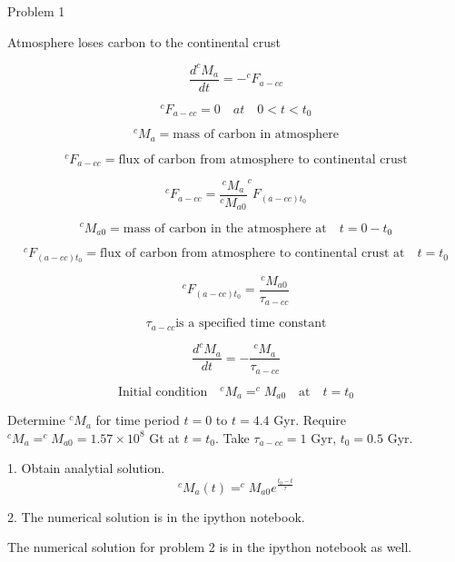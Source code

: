 Problem 1

Atmosphere loses carbon to the continental crust

\begin{equation}
  \frac{d^{c}M_{a}}{dt} = -^{c}F_{a-cc}
\end{equation}

\begin{equation}
  ^{c}F_{a-cc} = 0 \quad at \quad 0 < t < t_0
\end{equation}

\begin{equation}
  ^{c}M_{a} = \text{mass of carbon in atmosphere}
\end{equation}

\begin{equation}
  ^{c}F_{a-cc} = \text{flux of carbon from atmosphere to continental crust}
\end{equation}

\begin{equation}
  ^{c}F_{a-cc} = \frac{^{c}M_{a}}{^{c}M_{a0}} ^{c}F_{(a-cc)t_{0}}
\end{equation}

\begin{equation}
  ^{c}M_{a0} = \text{mass of carbon in the atmosphere at} \quad t = 0 - t_{0}
\end{equation}

\begin{equation}
  ^{c}F_{(a-cc)t_{0}} = \text{flux of carbon from atmosphere to continental crust at} \quad t=t_0
\end{equation}

\begin{equation}
  ^{c}F_{(a-cc)t_{0}} = \frac{^{c}M_{a0}}{\tau_{a-cc}}
\end{equation}

\begin{equation}
  \tau_{a-cc} \text{is a specified time constant}
\end{equation}

\begin{equation}
  \frac{d^{c}M_{a}}{dt} = - \frac{^{c}M_a}{\tau_{a-cc}}
\end{equation}

\begin{equation}
  \text{Initial condition} \quad ^{c}M_{a} = ^{c}M_{a0} \quad \text{at} \quad t=t_{0}
\end{equation}

Determine $^{c}M_{a}$ for time period $t=0$ to $t=4.4$ Gyr. Require $^{c}M_{a} = ^{c}M_{a0} = 1.57 \times 10^8$ Gt at $t = t_0$. Take $\tau_{a-cc} = 1$ Gyr, $t_{0} = 0.5$ Gyr.

1. Obtain analytial solution.
  \begin{equation}
    ^{c} M_{a} (t) = ^{c} M_{a0} e^{\frac{t_{0} - t}{\tau}}
  \end{equation}

2. The numerical solution is in the ipython notebook.

The numerical solution for problem 2 is in the ipython notebook as well.
